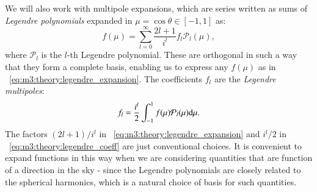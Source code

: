     We will also work with multipole expansions, which are series written as sums of \textit{Legendre polynomials} expanded in $\mu=\cos{\theta}\in[-1,1]$ as:
    \begin{equation}\label{eq:m3:theory:legendre_expansion}
        f(\mu) = \sum_{l=0}^{\infty}\frac{2l+1}{i^l}f_l\mathcal{P}_l(\mu),
    \end{equation}
    where $\mathcal{P}_l$ is the $l$-th Legendre polynomial. These are orthogonal in such a way that they form a complete basis, enabling us to express any $f(\mu)$ as in ~\cref{eq:m3:theory:legendre_expansion}. The coefficients $f_l$ are the \textit{Legendre multipoles}:
    \begin{equation}\label{eq:m3:theory:legendre_coeff}
        f_l = \frac{i^l}{2}\int_{-1}^1f(\mu)\mathcal{P}_l(\mu)\mathrm{d}\mu.
    \end{equation}
    The factors $(2l+1)/i^l$ in ~\cref{eq:m3:theory:legendre_expansion} and $i^l/2$ in ~\cref{eq:m3:theory:legendre_coeff} are just conventional choices. It is convenient to expand functions in this way when we are considering quantities that are function of a direction in the sky - since the Legendre polynomials are closely related to the spherical harmonics, which is a natural choice of basis for such quantities. 





